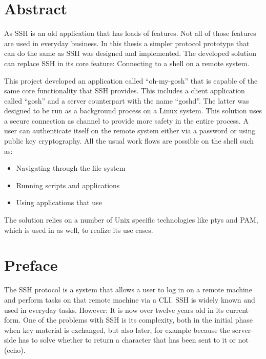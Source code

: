 \documentclass[10pt,a4paper,titlepage,twoside,english,final]{zhawreprt}
\begin{document}

\maketitle

\chapter*{Abstract}\label{sec:Abstract}
As \gls{SSH} is an old application that has loads of features.
Not all of those features are used in everyday business.
In this thesis a simpler protocol prototype that can do the same as \gls{SSH} was designed and implemented.
The developed solution can replace \gls{SSH} in its core feature:
Connecting to a \gls{shell} on a remote system.

This project developed an application called ``oh-my-gosh'' that is capable of the same core functionality that \gls{SSH} provides. This includes a client application called ``gosh'' and a server counterpart with the name ``goshd''.
The latter was designed to be run as a background process on a \gls{Linux} system.
This solution uses a secure connection as channel to provide more safety in the entire process.
A user can authenticate itself on the remote system either via a password or using public key cryptography.
All the usual work flows are possible on the \gls{shell} such as:

\begin{itemize}
\item Navigating through the file system
\item Running scripts and applications
\item Using applications that use \cite{ncurses}
\end{itemize}

The solution relies on a number of \gls{Unix} specific technologies like \glspl{pty} and \gls{PAM}, which is used in \cite{login} as well, to realize its use cases.


\chapter*{Preface}\label{sec:Preface}
The \gls{SSH} protocol \citep{rfc253,rfc6668,rfc8268,rfc8308,rfc8332} is a system that allows a user to log in on a remote machine and perform tasks on that remote machine via a \gls{CLI}.
\gls{SSH} is widely known and used in everyday tasks.
However: It is now over twelve years old in its current form.
One of the problems with \gls{SSH} is its complexity, both in the initial phase when key material is exchanged, but also later, for example because the server-side has to solve whether to return a character that has been sent to it or not (echo).
\end{document}

